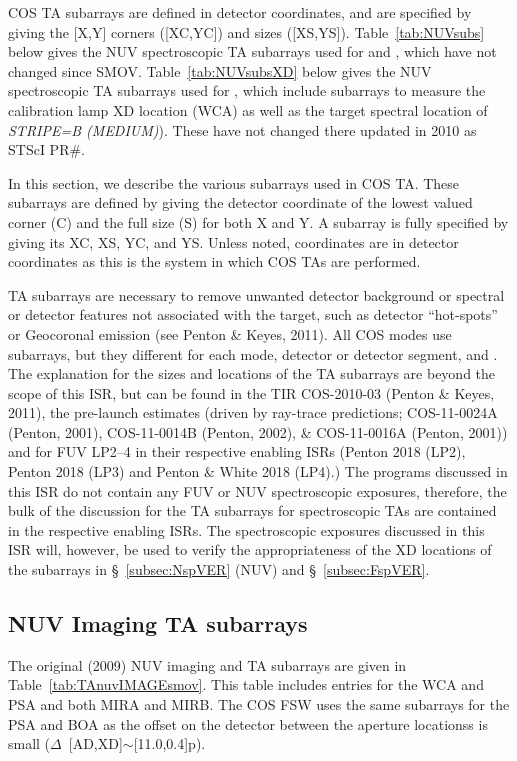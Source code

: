 COS TA subarrays are defined in detector coordinates, and are specified by giving the [X,Y] corners ([XC,YC]) and sizes ([XS,YS]).
Table~\ref{tab:NUVsubs} below gives the NUV spectroscopic TA subarrays used for  and , which have not changed since SMOV.
Table~\ref{tab:NUVsubsXD} below gives the NUV spectroscopic TA subarrays used for , which include subarrays to measure the
calibration lamp XD location (WCA) as well as the target spectral location of \textit{STRIPE=B (MEDIUM)}).
These have not changed there updated in 2010 as STScI PR\#{}.

In this section, we describe the various subarrays used in COS TA.
These subarrays are defined by giving the detector coordinate of the lowest valued corner (C) and the full size (S) for both X and Y.
A subarray is fully specified by giving its XC, XS, YC, and YS. Unless noted, coordinates are in detector coordinates as this is the system in which COS TAs are performed.

TA subarrays are necessary to remove unwanted detector background or spectral or detector features not associated with the target, such as detector
``hot-spots'' or Geocoronal emission (see Penton \& Keyes, 2011). All COS \tacq{} modes use subarrays, but they different for each mode, detector or detector segment,
and \cenwave.  The explanation for the sizes and locations of the TA subarrays are beyond the scope of this ISR, but can be found in the TIR COS-2010-03 (Penton \& Keyes, 2011),
the pre-launch estimates (driven by ray-trace predictions; COS-11-0024A (Penton, 2001), COS-11-0014B (Penton, 2002), \& COS-11-0016A (Penton, 2001)) and for
FUV LP2--4 in their respective enabling ISRs (Penton 2018 (LP2), Penton 2018 (LP3) and Penton \& White 2018 (LP4).)
The programs discussed in this ISR do not contain any FUV or NUV spectroscopic \tacq{} exposures, therefore, the bulk of the discussion for the TA subarrays for
spectroscopic TAs are contained in the respective enabling ISRs. The spectroscopic exposures discussed in this ISR will, however, be used to verify
the appropriateness of the XD locations of the subarrays in \S~\ref{subsec:NspVER} (NUV) and \S~\ref{subsec:FspVER}.

\subsection{NUV Imaging TA subarrays}\label{subsec:NUVimSUBS}
The original (2009) NUV imaging  and  TA subarrays are given in Table~\ref{tab:TAnuvIMAGEsmov}.
This table includes entries for the WCA and PSA and both MIRA and MIRB.
The COS FSW uses the same subarrays for the PSA and BOA as the offset on the detector between the aperture locationss is small ($\Delta$~[AD,XD]$\sim$[11.0,0.4]p).


